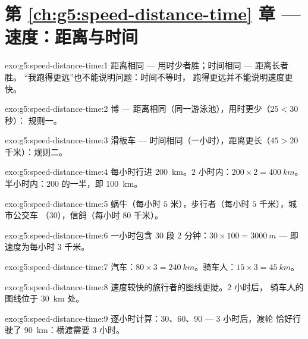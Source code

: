 \section*{第 \ref{ch:g5:speed-distance-time} 章 --- 速度：距离与时间}

\begin{solution}{exo:g5:speed-distance-time:1}
距离相同 --- 用时少者胜；时间相同 --- 距离长者胜。
“我跑得更远”也不能说明问题：时间不等时，
跑得更远并不能说明速度更快。
\end{solution}

\begin{solution}{exo:g5:speed-distance-time:2}
博 --- 距离相同（同一游泳池），用时更少（$25 < 30$ 秒）：
规则一。
\end{solution}

\begin{solution}{exo:g5:speed-distance-time:3}
滑板车 --- 时间相同（一小时），距离更长（$45 > 20$
千米）：规则二。
\end{solution}

\begin{solution}{exo:g5:speed-distance-time:4}
每小时行进 \qty{200}{km}。$2$ 小时内：$200 \times 2
= \qty{400}{km}$。半小时内：$200$ 的一半，即 \qty{100}{km}。
\end{solution}

\begin{solution}{exo:g5:speed-distance-time:5}
蜗牛（每小时 $5$ 米），步行者（每小时 $5$ 千米），城市公交车
（$30$），信鸽（每小时 $80$ 千米）。
\end{solution}

\begin{solution}{exo:g5:speed-distance-time:6}
一小时包含 $30$ 段 $2$ 分钟：$30 \times 100 =
\qty{3000}{m}$ --- 即速度为每小时 $3$ 千米。
\end{solution}

\begin{solution}{exo:g5:speed-distance-time:7}
汽车：$80 \times 3 = \qty{240}{km}$。骑车人：$15 \times 3 =
\qty{45}{km}$。
\end{solution}

\begin{solution}{exo:g5:speed-distance-time:8}
速度较快的旅行者的图线更陡。$2$ 小时后，
骑车人的图线位于 \qty{30}{km} 处。
\end{solution}

\begin{solution}{exo:g5:speed-distance-time:9}
逐小时计算：$30$、$60$、$90$ --- $3$ 小时后，渡轮
恰好行驶了 \qty{90}{km}：横渡需要 $3$ 小时。
\end{solution}

